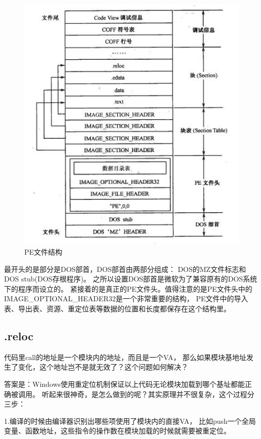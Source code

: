 \documentclass{book}
\begin{document}
\begin{figure}[htbp]
	\centering
	\includegraphics[scale=0.8]{PEFileFullStructure.jpg}
	\caption{PE文件结构}
	\label{fig:PEFileFullStructure}
\end{figure}

最开头的是部分是DOS部首，DOS部首由两部分组成：
DOS的MZ文件标志和DOS stub(DOS存根程序)。
之所以设置DOS部首是微软为了兼容原有的DOS系统下的程序而设立的。
紧接着的是真正的PE文件头。值得注意的是PE文件头中的IMAGE\_OPTIONAL\_HEADER32是一个非常重要的结构，
PE文件中的导入表、导出表、资源、重定位表等数据的位置和长度都保存在这个结构里。

\subsection{.reloc}

代码里call的地址是一个模块内的地址，而且是一个VA，
那么如果模块基地址发生了变化，这个地址岂不是就无效了？这个问题如何解决？

答案是：Windows使用重定位机制保证以上代码无论模块加载到哪个基址都能正确被调用。
听起来很神奇，是怎么做到的呢？其实原理并不很复杂，这个过程分三步：

1.编译的时候由编译器识别出哪些项使用了模块内的直接VA，
比如push一个全局变量、函数地址，这些指令的操作数在模块加载的时候就需要被重定位。
\end{document}
